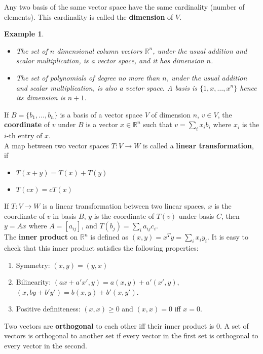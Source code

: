 \documentclass[20pt]{article} %
\theoremstyle{break}
\newtheorem{exa}[definition]{Example}
\begin{document}
Any two basis of the same vector space have the same cardinality (number of elements). This cardinality is called the {\bf dimension} of $V$.\\

\begin{exa}
  \begin{itemize}
  \item The set of $n$ dimensional column vectors $\mathbb{R}^n$, under the usual addition and scalar multiplication, is a vector space, and it has dimension $n$.
  \item The set of polynomials of degree no more than $n$, under the usual addition and scalar multiplication, is also a vector space. A basis is $\{1, x, \dots, x^n\}$ hence its dimension is $n+1$.
  \end{itemize}
\end{exa}


If $B=\{b_1, \dots, b_n\}$ is a basis of a vector space $V$ of dimension $n$, $v\in V$, the {\bf coordinate} of $v$ under $B$ is a vector $x\in\mathbb{R}^n$ such that $v=\sum_ix_ib_i$ where $x_i$ is the $i$-th entry of $x$.\\

A map between two vector spaces $T: V\rightarrow W$ is called a {\bf linear transformation}, if
\begin{itemize}
\item $T(x+y)=T(x)+T(y)$
\item $T(cx)=cT(x)$
\end{itemize}

If $T: V\rightarrow W$ is a linear transformation between two linear spaces, $x$ is the coordinate of $v$ in basis $B$, $y$ is the coordinate of $T(v)$ under basis $C$, then $y=Ax$ where $A=[a_{ij}]$, and $T(b_j)=\sum_ia_{ij}c_i$.\\

The {\bf inner product} on $\mathbb{R}^n$ is defined as $(x, y)=x^Ty=\sum_ix_iy_i$. It is easy to check that this inner product satisfies the following properties:
\begin{enumerate}
\item Symmetry: $(x, y)=(y, x)$
\item Bilinearity: $(ax+a'x', y)=a(x, y)+a'(x', y)$, $(x, by+b'y')=b(x, y)+b'(x, y')$.
\item Positive definiteness: $(x, x)\geq 0$ and $(x, x)=0$ iff $x=0$.
\end{enumerate}

Two vectors are {\bf orthogonal} to each other iff their inner product is $0$. A set of vectors is orthogonal to another set if every vector in the first set is orthogonal to every vector in the second.
\end{document}
